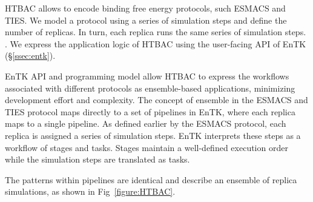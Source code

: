 HTBAC %
allows to %
encode binding free energy protocols, such ESMACS and TIES\@. We model a
protocol using a series of simulation steps and define the number of 
replicas. 
In turn, each replica runs the same series of simulation steps.
 . We express the application
logic of HTBAC using the user-facing API %
of EnTK (\S\ref{ssec:entk}). 


EnTK %
API and programming model  allow HTBAC to express the workflows associated
with different protocols as ensemble-based applications,
minimizing development effort and complexity. 
The concept of %
ensemble in the ESMACS and TIES  protocol maps directly to a set of pipelines in EnTK, where
each replica  maps to a single pipeline. As defined
earlier by the ESMACS protocol, each replica is assigned a series of
simulation steps.  EnTK interprets these steps as a workflow of stages and
tasks. Stages maintain a well-defined execution order while the simulation
steps are translated as tasks.


The patterns  within pipelines are identical and describe an ensemble of replica
simulations, as shown in Fig~\ref{figure:HTBAC}. 


